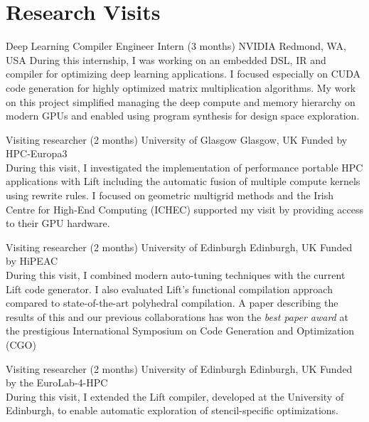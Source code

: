 \documentclass[11pt,a4paper,sans]{moderncv}        %
\begin{document}
\section{Research Visits}
					{Deep Learning Compiler Engineer Intern (3 months)}
					{NVIDIA}
					{Redmond, WA, USA}{}
					{
                    During this internship, I was working on an embedded DSL, IR and compiler for optimizing deep learning applications.
                    I focused especially on CUDA code generation for highly optimized matrix multiplication algorithms.
                    My work on this project simplified managing the deep compute and memory hierarchy on modern GPUs and enabled using program synthesis for design space exploration.
                    }

					{Visiting researcher (2 months)}
					{University of Glasgow}
					{Glasgow, UK}{}
					{Funded by HPC-Europa3\\
                     During this visit, I investigated the implementation of performance portable HPC applications with Lift including the automatic fusion of multiple compute kernels using rewrite rules.
                     I focused on geometric multigrid methods and the Irish Centre for High-End Computing (ICHEC) supported my visit by providing access to their GPU hardware.
					}

					{Visiting researcher (2 months)}
					{University of Edinburgh}
					{Edinburgh, UK}{}
					{Funded by HiPEAC\\
                     During this visit, I combined modern auto-tuning techniques with the current Lift code generator.
                     I also evaluated Lift's functional compilation approach compared to state-of-the-art polyhedral compilation.
                     A paper describing the results of this and our previous collaborations has won the \textit{best paper award} at the prestigious International Symposium on Code Generation and Optimization (CGO)~\cite{cgo2018}
					}

					{Visiting researcher (2 months)}
					{University of Edinburgh}
					{Edinburgh, UK}{}
					{Funded by the EuroLab-4-HPC\\
					 During this visit, I extended the Lift compiler, developed at the
					 University of Edinburgh, to enable automatic exploration of stencil-specific optimizations.
					}
\end{document}
